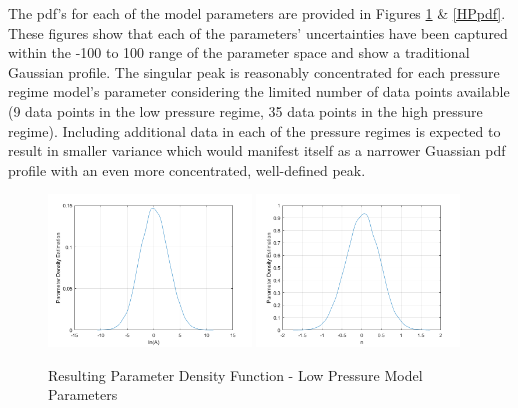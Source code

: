 \documentclass{article}
\begin{document}
The pdf's for each of the model parameters are provided in Figures \ref{LPpdf} \& \ref{HPpdf}. These figures show that each of 
the parameters' uncertainties have been captured within the -100 to 100 range of the parameter space and show 
a traditional Gaussian profile. The singular peak is reasonably concentrated for each pressure regime model's 
parameter considering the limited number of data points available (9 data points in the low pressure regime, 
35 data points in the high pressure regime). Including additional data in each of the pressure regimes
is expected to result in smaller variance which would manifest itself as a narrower Guassian pdf profile with an even
more concentrated, well-defined peak.

\begin{figure}[htb!]
\centering
\includegraphics[width=0.48\textwidth]{PDF_lnA_LP.png}
\includegraphics[width=0.48\textwidth]{PDF_n_LP.png}
\caption{Resulting Parameter Density Function - Low Pressure Model Parameters}
\label{LPpdf}
\end{figure}
\end{document}
